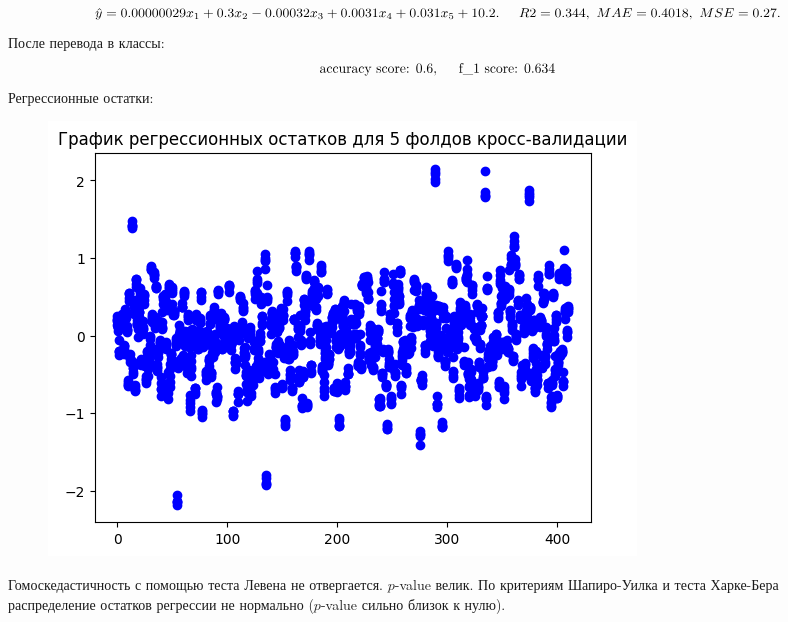 \documentclass[12pt]{report}
\begin{document}
  \[
    \hat{y} = 0.00000029 x_1 + 0.3 x_2 - 0.00032x_3 + 0.0031 x_4 + 0.031 x_5 + 10.2. \hspace*{0.5cm} R2 = 0.344, \ MAE = 0.4018, \ MSE = 0.27.
  \]
  После перевода в классы:
  \[
      \text{accuracy score: } 0.6, \hspace*{0.5cm} \text{f\_1 score: } 0.634 
  \]
  Регрессионные остатки:
  \begin{figure}[H]
    \centering
    \includegraphics[scale=0.5]{./imgs/despendency.png}
  \end{figure}
  Гомоскедастичность с помощью теста Левена не отвергается. $p$-value велик. По критериям Шапиро-Уилка и теста Харке-Бера распределение остатков регрессии не нормально ($p$-value сильно близок к нулю).
\end{document}
